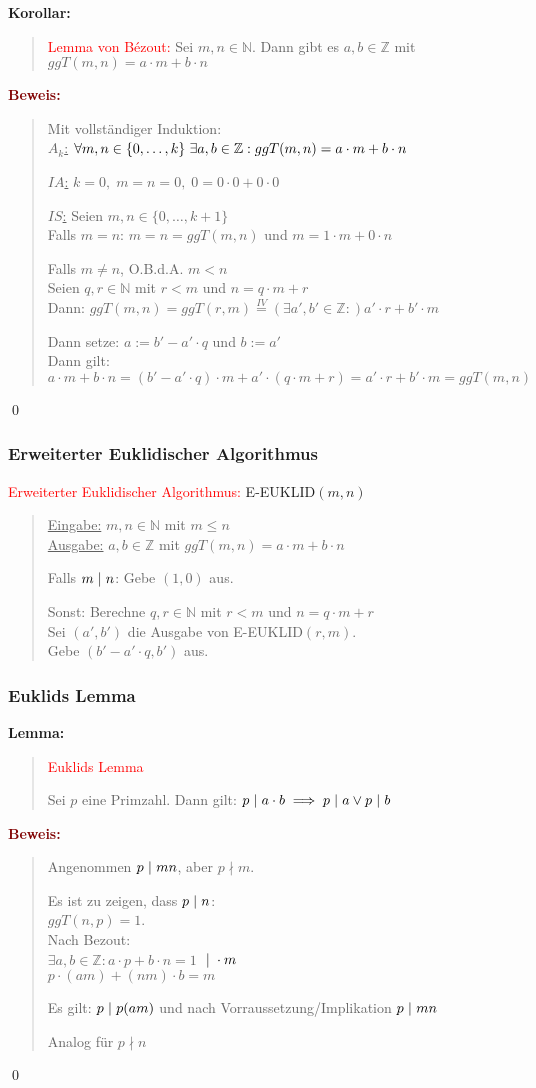 \documentclass{article}
\newcommand{\smsp}{\phantom{\hspace{3px}}}
\newcommand{\red}[1]{\textcolor{red}{#1}}
\newcommand{\dgr}[1]{\textcolor{dgr}{#1}}
\newcommand{\maroon}[1]{\textcolor{maroon}{#1}}
\newcommand{\lem}[1]{\dgr{\textbf{Lemma: }}\begin{quote}#1\end{quote}}
\newcommand{\co}[1]{\dgr{\textbf{Korollar: }}\begin{quote}#1\end{quote}}
\newcommand{\pr}[1]{\maroon{\textbf{Beweis: }}\begin{quote}#1\end{quote}\qed}
\newcommand{\N}{\mathbb{N}}
\newcommand{\Z}{\mathbb{Z}}
\renewcommand{\st}{\smsp | \smsp}
\begin{document}
\co{
    \red{Lemma von Bézout:} Sei $m,n \in \N$. Dann gibt es $a, b \in \Z$ mit $ggT(m,n) = a \cdot m + b \cdot n$
}

\pr{
    Mit vollständiger Induktion:\\
    \underline{$A_k$:} $\forall m,n \in \{0, \dots, k\} \smsp \exists a,b \in \Z: ggT(m,n) = a \cdot m + b \cdot n$

    \underline{$IA$:} $k = 0, \; m = n = 0, \; 0 = 0 \cdot 0 + 0 \cdot 0$

    \underline{$IS$:} Seien $m,n \in \{0, \dots, k+1\}$\\
    Falls $m = n$: $m = n = ggT(m,n)$ und $m = 1 \cdot m + 0 \cdot n$
    
    Falls $m \neq n$, O.B.d.A. $m < n$\\
    Seien $q,r \in \N$ mit $r < m$ und $n = q \cdot m + r$\\
    Dann: $ggT(m,n) = ggT(r, m) \overset{IV}{=} (\exists a',b' \in \Z:) a' \cdot r + b' \cdot m$

    Dann setze: $a := b' - a' \cdot q$ und $b := a'$\\
    Dann gilt: $a \cdot m + b \cdot n = (b' - a' \cdot q) \cdot m + a' \cdot (q \cdot m + r) = a' \cdot r + b' \cdot m = ggT(m,n)$
}

\subsubsection{Erweiterter Euklidischer Algorithmus}

\red{Erweiterter Euklidischer Algorithmus:} E-EUKLID$(m,n)$
\begin{quote}
    \underline{Eingabe:} $m,n \in \N$ mit $m \leq n$\\
    \underline{Ausgabe:} $a, b \in \Z$ mit $ggT(m,n) = a \cdot m + b \cdot n$

    Falls $m \st n$: Gebe $(1,0)$ aus.

    Sonst: Berechne $q, r \in \N$ mit $r < m$ und $n = q \cdot m + r$\\
    Sei $(a',b')$ die Ausgabe von E-EUKLID$(r,m)$.\\
    Gebe $(b' - a' \cdot q, b')$ aus.
\end{quote}

\subsubsection{Euklids Lemma}

\lem{
    \red{Euklids Lemma}

    Sei $p$ eine Primzahl. Dann gilt: $p \st a \cdot b \implies p \st a \lor p \st b$
}
\pr{
    Angenommen $p \st mn$, aber $p \nmid m$.

    Es ist zu zeigen, dass $p \st n$:\\
    $ggT(n,p) = 1$.\\
    Nach Bezout:\\
    $\exists a,b \in \Z: a \cdot p + b \cdot n = 1$ $\st \cdot m$\\
    $p \cdot (am) + (nm) \cdot b = m$

    Es gilt: $p \st p(am)$ und nach Vorraussetzung/Implikation $p \st mn$

    Analog für $p \nmid n$
}
\end{document}

